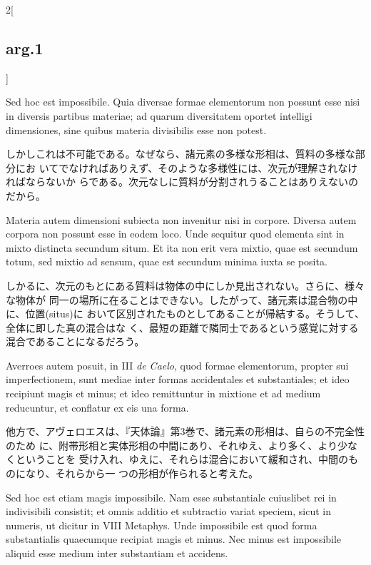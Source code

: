 \documentclass[paper=a4paper,fontsize=10pt,jafontsize=9pt,titlepage]{jlreq}
\begin{document}
\begin{paracol}{2}[\subsection{arg.1}]
\switchcolumn*


 Sed hoc est impossibile. Quia diversae formae elementorum non possunt esse nisi
in diversis partibus materiae; ad quarum diversitatem oportet intelligi
dimensiones, sine quibus materia divisibilis esse non potest.
 
\switchcolumn

 しかしこれは不可能である。なぜなら、諸元素の多様な形相は、質料の多様な部分にお
 いてでなければありえず、そのような多様性には、次元が理解されなければならないか
 らである。次元なしに質料が分割されうることはありえないのだから。

 
\switchcolumn*

Materia autem dimensioni subiecta non invenitur nisi in corpore. Diversa autem
corpora non possunt esse in eodem loco. Unde sequitur quod elementa sint in
mixto distincta secundum situm. Et ita non erit vera mixtio, quae est secundum
totum, sed mixtio ad sensum, quae est secundum minima iuxta se posita.

\switchcolumn

しかるに、次元のもとにある質料は物体の中にしか見出されない。さらに、様々な物体が
同一の場所に在ることはできない。したがって、諸元素は混合物の中に、位置(situs)に
おいて区別されたものとしてあることが帰結する。そうして、全体に即した真の混合はな
く、最短の距離で隣同士であるという感覚に対する混合であることになるだろう。
 
\switchcolumn*


Averroes autem posuit, in III {\itshape de Caelo}, quod formae elementorum,
propter sui imperfectionem, sunt mediae inter formas accidentales et
substantiales; et ideo recipiunt magis et minus; et ideo remittuntur in mixtione
et ad medium reducuntur, et conflatur ex eis una forma.
 
\switchcolumn

 他方で、アヴェロエスは、『天体論』第3巻で、諸元素の形相は、自らの不完全性のため
 に、附帯形相と実体形相の中間にあり、それゆえ、より多く、より少なくということを
 受け入れ、ゆえに、それらは混合において緩和され、中間のものになり、それらから一
 つの形相が作られると考えた。

 
\switchcolumn*

Sed hoc est etiam magis impossibile. Nam esse substantiale cuiuslibet rei in
indivisibili consistit; et omnis additio et subtractio variat speciem, sicut in
numeris, ut dicitur in VIII Metaphys. Unde impossibile est quod forma
substantialis quaecumque recipiat magis et minus. Nec minus est impossibile
aliquid esse medium inter substantiam et accidens.


\end{paracol}
\end{document}

